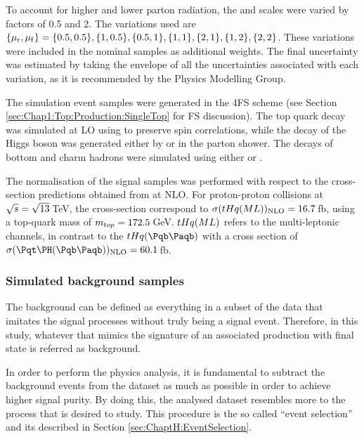 To account for higher and lower parton radiation, the \muR and \muF scales were varied 
by factors of 0.5 and 2. The variations used are $\{\mu_\mathrm{r}, \mu_\mathrm{f}\} = \{0.5,0.5\}, \{1,0.5\}, \{0.5,1\}, \{1,1\}, \{2,1\}, \{1,2\}, \{2,2\}$. 
These variations were included in the nominal samples as additional weights. The final 
uncertainty was estimated by taking the envelope of all the uncertainties associated with 
each variation, as it is recommended by the Physics Modelling 
Group\cite{PmgSystematicUncertaintyRecipes}.

The simulation event samples were generated in the 4FS scheme (see Section 
\ref{sec:Chap1:Top:Production:SingleTop} for FS discussion). The top quark decay was 
simulated at LO using \MADSPIN\cite{Frixione:2007vw}\cite{Artoisenet:2012st} to preserve 
spin correlations, while the decay of the Higgs boson was generated either by \PYTHIA[8] 
or \HERWIG[7] in the parton shower. The decays of bottom and charm hadrons were 
simulated using either \EVTGEN[1.6.0] or \EVTGEN[1.7.0]\cite{Lange:2001uf}.


The normalisation of the \tHq signal samples was performed with respect to the cross-section predictions obtained from \MGNLO at NLO. For proton-proton collisions at
$\sqrt{s} = \sqrt{13}\,$TeV, the cross-section correspond to $\sigma(tHq(ML))_{\text{NLO}} = 16.7\,$fb, 
using a top-quark mass of $m_{top} =172.5\,$GeV. $tHq (ML)$ refers
to the multi-leptonic channels, in contrast to the $\tHq(\bbbar)$ with a cross section of 
$\sigma(\tH(\bbbar))_{\text{NLO}} = 60.1\,$fb.


\subsubsection{Simulated background samples}
\label{sec:ChaptH:Data_and_MC:MC:Bkg}
The background can be defined as everything in a subset of the data that 
imitates the signal processes without truly being a signal event.  Therefore, 
in this study, whatever that mimics the signature of an associated \tHq production 
with  \dileptau final state is referred as background. 

In order to perform the physics analysis, it is fundamental to subtract the background events from the dataset
as much as possible in order to achieve higher signal purity.
By doing this, the analysed dataset resembles more to the process that is desired to study.
This procedure is the so called ``event selection'' and its described in Section \ref{sec:ChaptH:EventSelection}.

